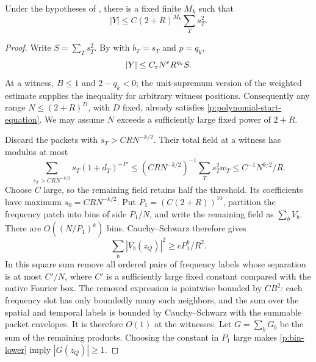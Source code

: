 \begin{lemma}\label{p:polynomial-start}
Under the hypotheses of , there is a fixed finite $M_k$
such that
\begin{equation}\label{p:polynomial-start-equation}
 |Y|\leq C(2+R)^{M_k}\sum_Ts_T^2.
\end{equation}
\end{lemma}
\begin{proof}
Write $S=\sum_Ts_T^2$.  By  with $b_T=s_T$ and $p=q_k$,
\begin{equation}\label{p:rough-scale-bound}
 |Y|\leq C_\varepsilon N^\varepsilon R^{q_k}S.
\end{equation}
At a witness, $B\leq1$ and $2-q_k<0$; the unit-supremum version of the
weighted estimate supplies the inequality for arbitrary witness positions.
Consequently any range $N\leq(2+R)^D$, with $D$ fixed, already satisfies
\eqref{p:polynomial-start-equation}.  We may assume $N$ exceeds a sufficiently
large fixed power of $2+R$.

Discard the packets with $s_T>C R N^{-k/2}$.  Their total field at a witness
has modulus at most
\[
 \sum_{s_T>C R N^{-k/2}}s_T(1+d_T)^{-P'}
 \leq (C R N^{-k/2})^{-1}\sum_Ts_T^2w_T
 \leq C^{-1}N^{k/2}/R.
\]
Choose $C$ large, so the remaining field retains half the threshold.
Its coefficients have maximum $s_0=C R N^{-k/2}$.
Put $P_1=(C(2+R))^{10}$, partition the frequency patch into bins of side
$P_1/N$, and write the remaining field as $\sum_bV_b$.
There are $O((N/P_1)^k)$ bins.  Cauchy--Schwarz therefore gives
\begin{equation}\label{p:bin-lower}
 \sum_b|V_b(z_Q)|^2\geq cP_1^k/R^2.
\end{equation}
In this square sum remove all ordered pairs of frequency labels whose
separation is at most $C'/N$, where $C'$ is a sufficiently large fixed
constant compared with the native Fourier box.  The removed expression is
pointwise bounded by $CB^2$: each frequency slot has only boundedly many
such neighbors, and the sum over the spatial and temporal labels is bounded
by Cauchy--Schwarz with the summable packet envelopes.  It is therefore $O(1)$
at the witnesses.  Let $G=\sum_bG_b$ be the sum of the remaining products.
Choosing the constant in $P_1$ large makes \eqref{p:bin-lower} imply
$|G(z_Q)|\geq1$.


\end{proof}
